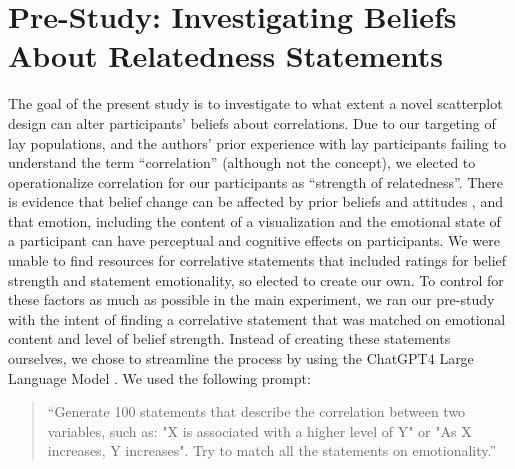 \documentclass[manuscript,screen,review,anonymous]{acmart}
\begin{document}
\section{Pre-Study: Investigating Beliefs About Relatedness
Statements}\label{sec-pre-study}

The goal of the present study is to investigate to what extent a novel
scatterplot design can alter participants' beliefs about correlations.
Due to our targeting of lay populations, and the authors' prior
experience with lay participants failing to understand the term
``correlation'' (although not the concept), we elected to operationalize
correlation for our participants as ``strength of relatedness''. There
is evidence that belief change can be affected by prior beliefs and
attitudes \citep{xiong_2022, markant_2023}, and that emotion, including
the content of a visualization \citep{phelps_2006, harrison_2013} and
the emotional state of a participant \citep{thoresen_2016} can have
perceptual and cognitive effects on participants. We were unable to find
resources for correlative statements that included ratings for belief
strength and statement emotionality, so elected to create our own. To
control for these factors as much as possible in the main experiment, we
ran our pre-study with the intent of finding a correlative statement
that was matched on emotional content and level of belief strength.
Instead of creating these statements ourselves, we chose to streamline
the process by using the ChatGPT4 Large Language Model \citep{chat_gpt}.
We used the following prompt:

\begin{quotation}
    ``Generate 100 statements that describe the correlation between two variables, such as:
     "X is associated with a higher level of Y" or
     "As X increases, Y increases".
    Try to match all the statements on emotionality.''
    
\end{quotation}
\end{document}
